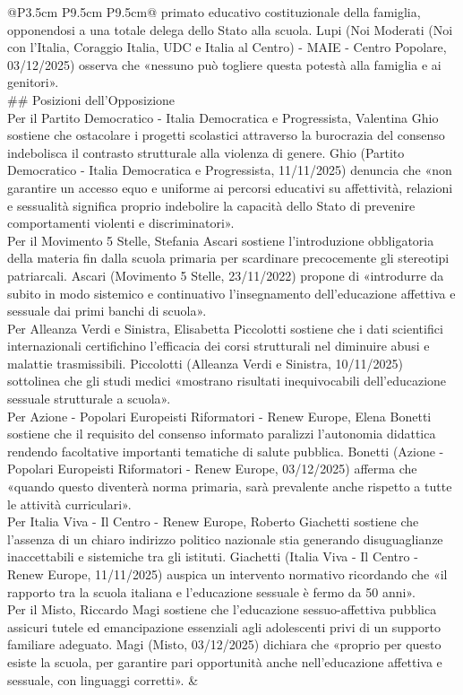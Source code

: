\documentclass[a4paper,11pt]{article}
\begin{document}
\begin{landscape}
\begin{longtable}{@{}P{3.5cm} P{9.5cm} P{9.5cm}@{}}
primato educativo costituzionale della famiglia, opponendosi a una totale delega dello Stato alla scuola. Lupi (Noi Moderati (Noi con l'Italia, Coraggio Italia, UDC e Italia al Centro) - MAIE - Centro Popolare, 03/12/2025) osserva che «nessuno può togliere questa potestà alla famiglia e ai genitori».\\[6pt] \#\# Posizioni dell'Opposizione\\[6pt] Per il Partito Democratico - Italia Democratica e Progressista, Valentina Ghio sostiene che ostacolare i progetti scolastici attraverso la burocrazia del consenso indebolisca il contrasto strutturale alla violenza di genere. Ghio (Partito Democratico - Italia Democratica e Progressista, 11/11/2025) denuncia che «non garantire un accesso equo e uniforme ai percorsi educativi su affettività, relazioni e sessualità significa proprio indebolire la capacità dello Stato di prevenire comportamenti violenti e discriminatori».\\[6pt] Per il Movimento 5 Stelle, Stefania Ascari sostiene l'introduzione obbligatoria della materia fin dalla scuola primaria per scardinare precocemente gli stereotipi patriarcali. Ascari (Movimento 5 Stelle, 23/11/2022) propone di «introdurre da subito in modo sistemico e continuativo l'insegnamento dell'educazione affettiva e sessuale dai primi banchi di scuola».\\[6pt] Per Alleanza Verdi e Sinistra, Elisabetta Piccolotti sostiene che i dati scientifici internazionali certifichino l'efficacia dei corsi strutturali nel diminuire abusi e malattie trasmissibili. Piccolotti (Alleanza Verdi e Sinistra, 10/11/2025) sottolinea che gli studi medici «mostrano risultati inequivocabili dell'educazione sessuale strutturale a scuola».\\[6pt] Per Azione - Popolari Europeisti Riformatori - Renew Europe, Elena Bonetti sostiene che il requisito del consenso informato paralizzi l'autonomia didattica rendendo facoltative importanti tematiche di salute pubblica. Bonetti (Azione - Popolari Europeisti Riformatori - Renew Europe, 03/12/2025) afferma che «quando questo diventerà norma primaria, sarà prevalente anche rispetto a tutte le attività curriculari».\\[6pt] Per Italia Viva - Il Centro - Renew Europe, Roberto Giachetti sostiene che l'assenza di un chiaro indirizzo politico nazionale stia generando disuguaglianze inaccettabili e sistemiche tra gli istituti. Giachetti (Italia Viva - Il Centro - Renew Europe, 11/11/2025) auspica un intervento normativo ricordando che «il rapporto tra la scuola italiana e l'educazione sessuale è fermo da 50 anni».\\[6pt] Per il Misto, Riccardo Magi sostiene che l'educazione sessuo-affettiva pubblica assicuri tutele ed emancipazione essenziali agli adolescenti privi di un supporto familiare adeguato. Magi (Misto, 03/12/2025) dichiara che «proprio per questo esiste la scuola, per garantire pari opportunità anche nell'educazione affettiva e sessuale, con linguaggi corretti». & \\

\end{longtable}
\end{landscape}
\end{document}
